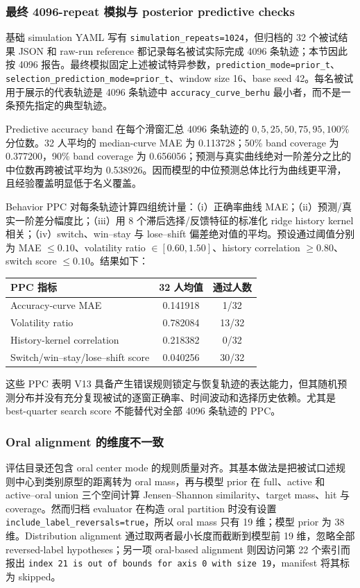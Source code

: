 \subsubsection{最终 4096-repeat 模拟与 posterior predictive checks}

基础 simulation YAML 写有 \texttt{simulation\_repeats=1024}，但归档的 32 个被试结果 JSON 和 raw-run reference 都记录每名被试实际完成 4096 条轨迹；本节因此按 4096 报告。最终模拟固定上述被试特异参数，\texttt{prediction\_mode=prior\_t}、\texttt{selection\_prediction\_mode=prior\_t}、window size 16、base seed 42。每名被试用于展示的代表轨迹是 4096 条轨迹中 \texttt{accuracy\_curve\_berhu} 最小者，而不是一条预先指定的典型轨迹。

Predictive accuracy band 在每个滑窗汇总 4096 条轨迹的 $0,5,25,50,75,95,100\%$ 分位数。32 人平均的 median-curve MAE 为 0.113728；50\% band coverage 为 0.377200，90\% band coverage 为 0.656056；预测与真实曲线绝对一阶差分之比的中位数再跨被试平均为 0.538926。因而模型的中位预测总体比行为曲线更平滑，且经验覆盖明显低于名义覆盖。

Behavior PPC 对每条轨迹计算四组统计量：（i）正确率曲线 MAE；（ii）预测/真实一阶差分幅度比；（iii）用 8 个滞后选择/反馈特征的标准化 ridge history kernel 相关；（iv）switch、win--stay 与 lose--shift 偏差绝对值的平均。预设通过阈值分别为 MAE $\leq0.10$、volatility ratio $\in[0.60,1.50]$、history correlation $\geq0.80$、switch score $\leq0.10$。结果如下：
\begin{center}
\small
\begin{tabular}{l|c|c}
PPC 指标 & 32 人均值 & 通过人数\\
\hline
Accuracy-curve MAE & 0.141918 & 1/32\\
Volatility ratio & 0.782084 & 13/32\\
History-kernel correlation & 0.218382 & 0/32\\
Switch/win--stay/lose--shift score & 0.040256 & 30/32\\
\end{tabular}
\end{center}
这些 PPC 表明 V13 具备产生错误规则锁定与恢复轨迹的表达能力，但其随机预测分布并没有充分复现被试的逐窗正确率、时间波动和选择历史依赖。尤其是 best-quarter search score 不能替代对全部 4096 条轨迹的 PPC。


\subsubsection{Oral alignment 的维度不一致}

评估目录还包含 oral center mode 的规则质量对齐。其基本做法是把被试口述规则中心到类别原型的距离转为 oral mass，再与模型 prior 在 full、active 和 active--oral union 三个空间计算 Jensen--Shannon similarity、target mass、hit 与 coverage。然而归档 evaluator 在构造 oral partition 时没有设置 \texttt{include\_label\_reversals=true}，所以 oral mass 只有 19 维；模型 prior 为 38 维。Distribution alignment 通过取两者最小长度而截断到模型前 19 维，忽略全部 reversed-label hypotheses；另一项 oral-based alignment 则因访问第 22 个索引而报出 \texttt{index 21 is out of bounds for axis 0 with size 19}，manifest 将其标为 skipped。

